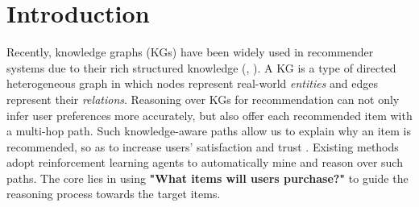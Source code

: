 \section{Introduction}


Recently, knowledge graphs (KGs) have been widely used in 
recommender systems
due to their rich structured knowledge
 (\eg, \cite{ripplenet, pgpr, CKE, DKN, KSR, shine, 
ADAC, wu2021disenkgat, zeng2022shadewatcher,
RNNexpl}). A KG is a type of directed heterogeneous graph in which nodes 
represent
real-world \textit{entities} and edges represent their \textit{relations}.
%
Reasoning over KGs \cite{pgpr, ADAC} for recommendation can not 
only infer user preferences more accurately, but also
offer each recommended item with a multi-hop path. Such 
knowledge-aware paths allow us to explain why an item is recommended, so as to increase users' satisfaction and trust \cite{surveyExp, 
effectiveRec}.
%
Existing methods adopt reinforcement learning agents to automatically mine and reason over such paths.
The core lies in  using 
\textbf{"What items will users purchase?"}
 to guide the 
reasoning process towards the target items.



